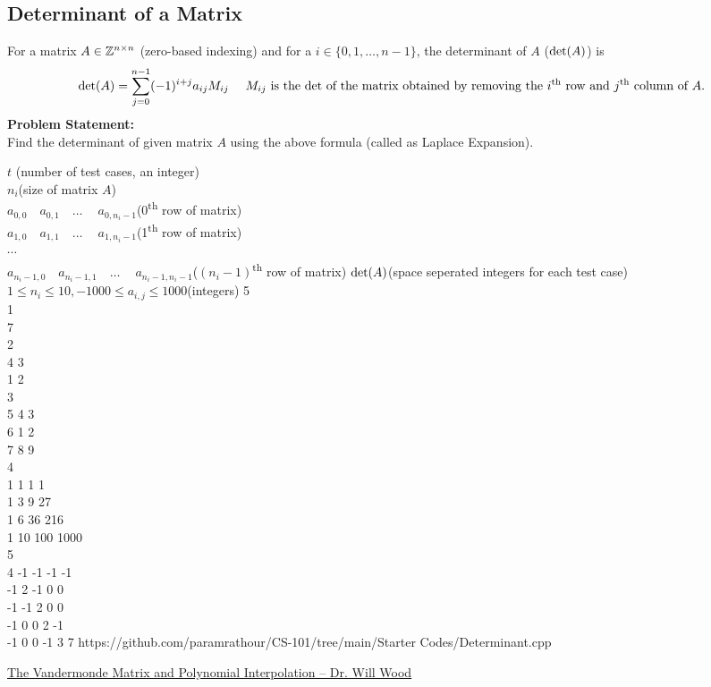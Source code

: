 \subsection{Determinant of a Matrix}
For a matrix $A\in \mathbb{Z}^{n\times n}$ (zero-based indexing) and for a $i\in\{0,1,\ldots,n-1\}$, the determinant of $A$ ($\operatorname{det}(A)$) is
\begin{equation}
\det(A)=\sum _{j=0}^{n-1}(-1)^{i+j}a_{ij}M_{ij}%
\quad \text{ $M_{ij}$ is the $\op{det}$ of the matrix obtained by removing the $i$\textsuperscript{th} row and $j$\textsuperscript{th} column of $A$.}%
\end{equation}
\textbf{Problem Statement:}\\
Find the determinant of given matrix $A$ using the above formula (called as Laplace Expansion).
\begin{testcases}
	{$t$ \hfill(number of test cases, an integer)\\$n_i$\hfill(size of matrix $A$)\\$a_{0,0}\quad a_{0,1}\quad \ldots \quad\ a_{0,n_i-1}$\quad\hfill(0\textsuperscript{th} row of matrix)\\$a_{1,0}\quad a_{1,1}\quad \ldots \quad\ a_{1,n_i-1}$\quad \hfill(1\textsuperscript{th} row of matrix)\\$\cdots$\\$a_{n_i-1,0}\quad a_{n_i-1,1}\quad \ldots \quad\ a_{n_i-1,n_i-1}$\hfill($(n_i-1)$\textsuperscript{th} row of matrix)}
	{$\operatorname{det}(A)$\hfill(space seperated integers for each test case)}
	{$1\leq n_i \leq 10, -1000\leq a_{i,j}\leq 1000$\hfill(integers)}
	{5\\1\\7\\2\\4 3\\1 2\\3\\5 4 3\\6 1 2\\7 8 9\\4\\1 1 1 1\\1 3 9 27\\1 6 36 216\\1 10 100 1000\\5\\4 -1 -1 -1 -1\\-1 2 -1 0 0\\-1 -1 2 0 0 \\-1 0 0 2 -1\\-1 0 0 -1 3}
	{7}
	{https://github.com/paramrathour/CS-101/tree/main/Starter Codes/Determinant.cpp}
\end{testcases}
\begin{funvideo}
	\href{https://youtu.be/Cov_kLatdlc}{The Vandermonde Matrix and Polynomial Interpolation -- Dr. Will Wood}
\end{funvideo}